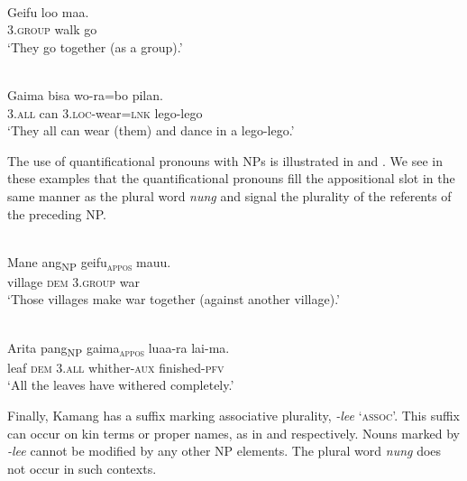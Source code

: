 \ea%
 \\
\label{ex:9:40}
\gll  Geifu   loo maa.  \\
  3.\textsc{group} walk go   \\
\glt `They go together (as a group).'
\z






\ea%
\label{ex:9:41}
 \\
\gll Gaima bisa wo-ra=bo pilan. \\
  3.\textsc{all} can   3.\textsc{loc}-wear=\textsc{lnk} lego-lego  \\
\glt `They all can wear (them) and dance in a lego-lego.'
\z






The use of quantificational pronouns with NPs is illustrated in  and . We see in these examples that the quantificational pronouns fill the appositional slot in the same manner as the plural word \textit{nung} and signal the plurality of the referents of the preceding NP.


\ea%
\label{ex:9:42}
 \\
\gll   {\ob}Mane ang{\cb}\textsubscript{\upshape \textsc{NP}} {geifu}\textsubscript{\upshape \textsc{appos}}   {mauu.}\\
  village \textsc{dem} 3.\textsc{group} war  \\
\glt `Those villages make war together (against another village).'
\z






\ea%
\label{ex:9:43}
 \\
\gll  {\ob}Arita pang{\cb}\textsubscript{\upshape NP} {gaima}\textsubscript{\upshape \textsc{appos}} luaa-ra lai-ma{.}\\
    leaf \textsc{dem}   3.\textsc{all} whither-\textsc{aux} finished-\textsc{pfv}\\
\glt `All the leaves have withered completely.'
\z






Finally, Kamang has a suffix marking associative plurality, \textit{-lee} `\textsc{assoc}'. This suffix can occur on kin terms or proper names, as in  and  respectively. Nouns marked by \textit{-lee} cannot be modified by any other NP elements. The plural word \textit{nung} does not occur in such contexts.


